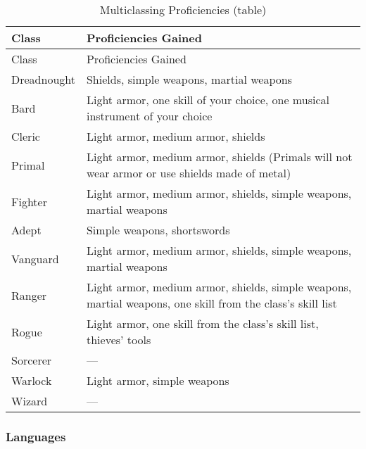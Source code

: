 \begin{longtable}[]{@{}
  >{\raggedright\arraybackslash}p{}
  >{\raggedright\arraybackslash}p{}@{}}
\caption{Multiclassing Proficiencies
(table)}\label{multiclassing-proficiencies-table}\tabularnewline
\toprule\noalign{}
\begin{minipage}[b]{\linewidth}\raggedright
Class
\end{minipage} & \begin{minipage}[b]{\linewidth}\raggedright
Proficiencies Gained
\end{minipage} \\
\midrule\noalign{}
\endfirsthead
\toprule\noalign{}
\begin{minipage}[b]{\linewidth}\raggedright
Class
\end{minipage} & \begin{minipage}[b]{\linewidth}\raggedright
Proficiencies Gained
\end{minipage} \\
\midrule\noalign{}
\endhead
\bottomrule\noalign{}
\endlastfoot
Dreadnought & Shields, simple weapons, martial weapons \\
Bard & Light armor, one skill of your choice, one musical instrument of
your choice \\
Cleric & Light armor, medium armor, shields \\
Primal & Light armor, medium armor, shields (Primals will not wear armor
or use shields made of metal) \\
Fighter & Light armor, medium armor, shields, simple weapons, martial
weapons \\
Adept & Simple weapons, shortswords \\
Vanguard & Light armor, medium armor, shields, simple weapons, martial
weapons \\
Ranger & Light armor, medium armor, shields, simple weapons, martial
weapons, one skill from the class's skill list \\
Rogue & Light armor, one skill from the class's skill list, thieves'
tools \\
Sorcerer & --- \\
Warlock & Light armor, simple weapons \\
Wizard & --- \\
\end{longtable}

\subsubsection{Languages}\label{languages}

